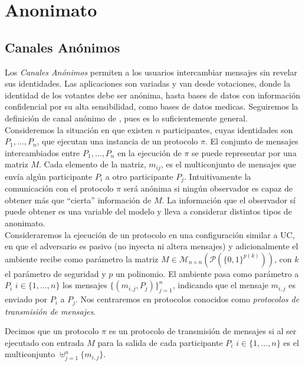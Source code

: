 \chapter{Anonimato} \label{sect:AC}

\section{Canales Anónimos}

Los \textit{Canales Anónimos} permiten a los usuarios intercambiar mensajes sin revelar sus
identidades. Las aplicaciones son variadas y van desde votaciones, donde la identidad de los
votantes debe ser anónima, hasta bases de datos con información confidencial por su alta sensibilidad,
como bases de datos medicas.
Seguiremos la definición de canal anónimo de \cite{conf/pet/HeviaM08}, pues es lo suficientemente
general.\\
Consideremos la situación en que existen $n$ participantes, cuyas identidades son $P_{1},\ldots,P_{n}$,
que ejecutan una instancia de un protocolo $\pi$.
El conjunto de mensajes intercambiados entre $P_{1},\ldots,P_{n}$ en la ejecución de $\pi$ se puede
representar por una matriz $M$. Cada elemento de la matriz, $m_{ij}$,
es el multiconjunto de mensajes que envía algún participante $P_{i}$ a
otro participante $P_{j}$. Intuitivamente la comunicación con el
protocolo $\pi$ será anónima si ningún observador es capaz de obtener
más que ``cierta'' información de $M$. La información que el observador
sí puede obtener es una variable del modelo y lleva a considerar
distintos tipos de anonimato.\\
Consideraremos la ejecución de un protocolo en una configuración similar a UC, en que el adversario
es pasivo (no inyecta ni altera mensajes) y adicionalmente el ambiente recibe como parámetro la matriz
$M \in \mathcal{M}_{n \times n}(\mathcal{P}(\{0,1\}^{p(k)}))$, con $k$ el parámetro de seguridad y $p$
un polinomio. El ambiente pasa como parámetro a $P_i$ $i \in \{1, \ldots, n\}$ los mensajes
$\{(m_{i,j}, P_j)\}_{j=1}^n$, indicando que el mensaje $m_{i, j}$ es enviado por $P_i$ a $P_j$.
Nos centraremos en protocolos conocidos como \textit{protocolos de transmisión de mensajes}.

\begin{definicion}
Decimos que un protocolo $\pi$ es un protocolo de transmisión de mensajes si al ser ejecutado con entrada
$M$ para la salida de cada participante $P_i$ $i \in \{1, \ldots, n\}$ es el multiconjunto
$\uplus_{j=1}^n \{m_{i,j}\}$.
\end{definicion}

